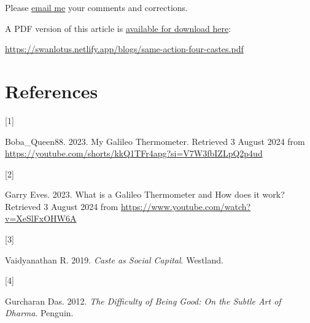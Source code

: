 \documentclass[
  a4paper,
]{article}
\newlength{\cslhangindent}
\newlength{\csllabelwidth}
\newenvironment{CSLReferences}[2] %
 {\begin{list}{}{%
  \setlength{\itemindent}{0pt}
  \setlength{\leftmargin}{0pt}
  \setlength{\parsep}{0pt}
  \ifodd #1
   \setlength{\leftmargin}{\cslhangindent}
   \setlength{\itemindent}{-1\cslhangindent}
  \fi
  \setlength{\itemsep}{#2\baselineskip}}}
 {\end{list}}
\newcommand{\CSLLeftMargin}[1]{\parbox[t]{\csllabelwidth}{\strut#1\strut}}
\newcommand{\CSLRightInline}[1]{\parbox[t]{\linewidth - \csllabelwidth}{\strut#1\strut}}
\begin{document}
Please \href{mailto:feedback.swanlotus@gmail.com}{email me} your
comments and corrections.

\noindent A PDF version of this article is
\href{./same-action-four-castes.pdf}{available for download here}:

\begin{small}

\begin{sffamily}

\url{https://swanlotus.netlify.app/blogs/same-action-four-castes.pdf}

\end{sffamily}

\end{small}

\section*{References}\label{bibliography}

\label{refs}
\begin{CSLReferences}{0}{0}
\CSLLeftMargin{{[}1{]} }%
\CSLRightInline{Boba\_Queen88. 2023. {My Galileo Thermometer}. Retrieved
3 August 2024 from
\url{https://youtube.com/shorts/kkQ1TFr4apg?si=V7W3fbIZLpQ2p4ud}}

\CSLLeftMargin{{[}2{]} }%
\CSLRightInline{Garry Eves. 2023. {What is a Galileo Thermometer and How
does it work?} Retrieved 3 August 2024 from
\url{https://www.youtube.com/watch?v=XeSlFxOHW6A}}

\CSLLeftMargin{{[}3{]} }%
\CSLRightInline{Vaidyanathan R. 2019. \emph{{Caste as Social Capital}}.
Westland.}

\CSLLeftMargin{{[}4{]} }%
\CSLRightInline{Gurcharan Das. 2012. \emph{{The Difficulty of Being
Good}: {On the Subtle Art of Dharma}}. Penguin.}

\end{CSLReferences}
\end{document}
